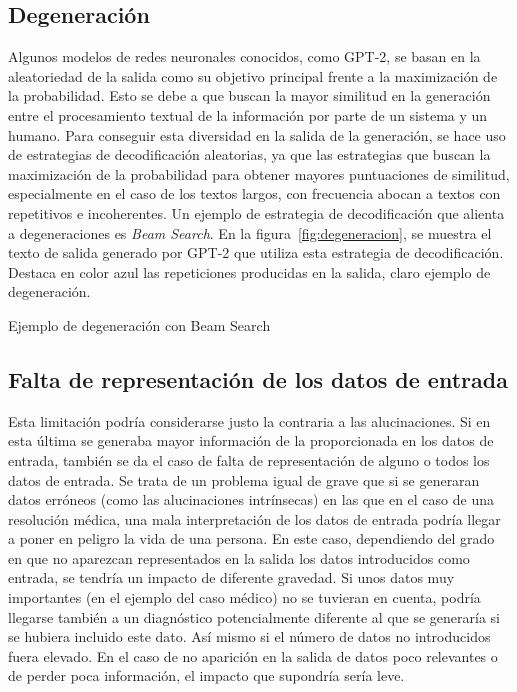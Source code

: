 \subsection{Degeneración}

Algunos modelos de redes neuronales conocidos, como GPT-2, se basan en la aleatoriedad de la salida como su objetivo principal frente a la maximización de la probabilidad. Esto se debe a que buscan la mayor similitud en la generación entre el procesamiento textual de la información por parte de un sistema y un humano. Para conseguir esta diversidad en la salida de la generación, se hace uso de estrategias de decodificación aleatorias, ya que las estrategias que buscan la maximización de la probabilidad para obtener mayores puntuaciones de similitud, especialmente en el caso de los textos largos, con frecuencia abocan a textos con repetitivos e incoherentes. Un ejemplo de estrategia de decodificación que alienta a degeneraciones es \textit{Beam Search}. En la figura~\ref{fig:degeneracion}, se muestra el texto de salida generado por GPT-2 que utiliza esta estrategia de decodificación. Destaca en color azul las repeticiones producidas en la salida, claro ejemplo de degeneración.

%
{Ejemplo de degeneración con Beam Search }

\subsection{Falta de representación de los datos de entrada}

Esta limitación podría considerarse justo la contraria a las alucinaciones. Si en esta última se generaba mayor información de la proporcionada en los datos de entrada, también se da el caso de falta de representación de alguno o todos los datos de entrada. Se trata de un problema igual de grave que si se generaran datos erróneos (como las alucinaciones intrínsecas) en las que en el caso de una resolución médica, una mala interpretación de los datos de entrada podría llegar a poner en peligro la vida de una persona. En este caso, dependiendo del grado en que no aparezcan representados en la salida los datos introducidos como entrada, se tendría un impacto de diferente gravedad. Si unos datos muy importantes (en el ejemplo del caso médico) no se tuvieran en cuenta, podría llegarse también a un diagnóstico potencialmente diferente al que se generaría si se hubiera incluido este dato. Así mismo si el número de datos no introducidos fuera elevado. En el caso de no aparición en la salida de datos poco relevantes o de perder poca información, el impacto que supondría sería leve.